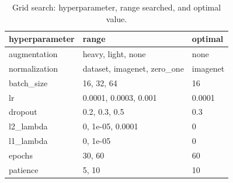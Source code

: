 \begin{table}[htbp]
\centering
\small
\caption{Grid search: hyperparameter, range searched, and optimal value.}
\label{tab:q1hyper}
\begin{tabular}{lll}
\hline
hyperparameter & range & optimal \\
\hline
augmentation & heavy, light, none & none \\
normalization & dataset, imagenet, zero\_one & imagenet \\
batch\_size & 16, 32, 64 & 16 \\
lr & 0.0001, 0.0003, 0.001 & 0.0001 \\
dropout & 0.2, 0.3, 0.5 & 0.3 \\
l2\_lambda & 0, 1e-05, 0.0001 & 0 \\
l1\_lambda & 0, 1e-05 & 0 \\
epochs & 30, 60 & 60 \\
patience & 5, 10 & 10 \\
\hline
\end{tabular}
\end{table}
